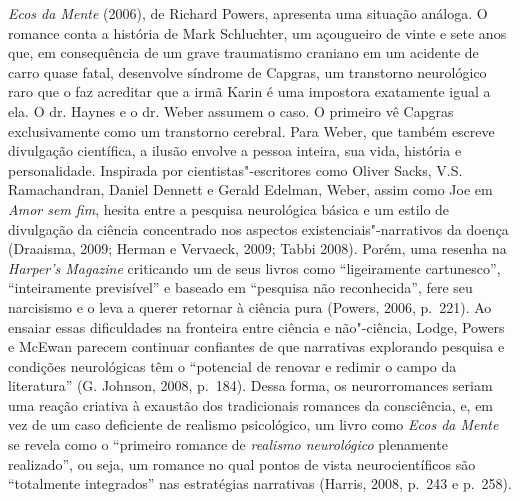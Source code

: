 \emph{Ecos da Mente} (2006), de Richard Powers, apresenta uma situação
análoga. O romance conta a história de Mark Schluchter, um açougueiro de
vinte e sete anos que, em consequência de um grave traumatismo craniano
em um acidente de carro quase fatal, desenvolve síndrome de Capgras, um
transtorno neurológico raro que o faz acreditar que a irmã Karin é uma
impostora exatamente igual a ela. O dr. Haynes e o dr. Weber assumem o
caso. O primeiro vê Capgras exclusivamente como um transtorno cerebral.
Para Weber, que também escreve divulgação científica, a ilusão envolve a
pessoa inteira, sua vida, história e personalidade. Inspirada por
cientistas"-escritores como Oliver Sacks, V.S. Ramachandran, Daniel
Dennett e Gerald Edelman, Weber, assim como Joe em \emph{Amor sem fim},
hesita entre a pesquisa neurológica básica e um estilo de divulgação da
ciência concentrado nos aspectos existenciais"-narrativos da doença
(Draaisma, 2009; Herman e Vervaeck, 2009; Tabbi 2008). Porém, uma
resenha na \emph{Harper's Magazine} criticando um de seus livros como
``ligeiramente cartunesco'', ``inteiramente previsível'' e baseado em
``pesquisa não reconhecida'', fere seu narcisismo e o leva a querer
retornar à ciência pura (Powers, 2006, p.~221). Ao ensaiar essas
dificuldades na fronteira entre ciência e não"-ciência, Lodge, Powers e
McEwan parecem continuar confiantes de que narrativas explorando
pesquisa e condições neurológicas têm o ``potencial de renovar e redimir
o campo da literatura'' (G. Johnson, 2008, p.~184). Dessa forma, os
neurorromances seriam uma reação criativa à exaustão dos tradicionais
romances da consciência, e, em vez de um caso deficiente de realismo
psicológico, um livro como \emph{Ecos da Mente} se revela como o
``primeiro romance de \emph{realismo neurológico} plenamente
realizado'', ou seja, um romance no qual pontos de vista
neurocientíficos são ``totalmente integrados'' nas estratégias
narrativas (Harris, 2008, p.~243 e p.~258).

